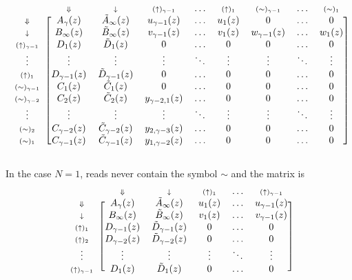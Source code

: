 \documentclass{article}
\newcommand{\DN}{\scriptstyle{\Downarrow}}
\newcommand{\dn}{\scriptstyle{\downarrow}}
\newcommand{\up}[1]{\scriptstyle{(\uparrow)_{#1}}}
\newcommand{\eq}[1]{\scriptstyle{(\sim)_{#1}}}
\begin{document}
\begin{equation*}
\begin{blockarray}{ccccccccc}
   & \DN & \dn &\up{\gamma-1} & \ldots & \up{1} &
    \eq{\gamma-1} & \ldots & \eq{1} \\
\begin{block}{c[cccccccc]}
\DN & A_\gamma(z) & \tilde{A}_\infty(z) & u_{\gamma-1}(z) & \ldots &
    u_1(z) & 0 & \ldots & 0 \\
\dn & B_\infty(z) & \tilde{B}_\infty(z) & v_{\gamma-1}(z) & \ldots &
    v_1(z) & w_{\gamma-1}(z) & \ldots & w_1(z) \\
\up{\gamma-1} & D_1(z) & \tilde{D}_1(z) & 0 & 
    \ldots & 0 & 0 & \ldots & 0 \\
\vdots & \vdots & \vdots & \vdots & \ddots & \vdots & \vdots &
    \ddots & \vdots \\
\up{1} & D_{\gamma-1}(z) & \tilde{D}_{\gamma-1}(z) & 0 & \ldots & 0 & 0 &
    \ldots & 0 \\
\eq{\gamma-1} & C_1(z) & \tilde{C}_1(z) & 0 & \ldots & 0 & 0 &
    \ldots & 0 \\
\eq{\gamma-2} & C_2(z) & \tilde{C}_2(z) & y_{\gamma-2,1}(z) &
    \ldots & 0 & 0 & \ldots & 0 \\
\vdots & \vdots & \vdots & \vdots & \ddots & \vdots & \vdots &
    \ddots & \vdots \\
\eq{2} & C_{\gamma-2}(z) & \tilde{C}_{\gamma-2}(z) &
    y_{2,\gamma-3}(z) & \ldots & 0 & 0 & \ldots & 0 \\
\eq{1} & C_{\gamma-1}(z) & \tilde{C}_{\gamma-1}(z) &
    y_{1,\gamma-2}(z) & \ldots & 0 & 0 & \ldots & 0 \\
\end{block}
\end{blockarray}
\end{equation*}

In the case $N = 1$, reads never contain the symbol $\sim$ and the matrix
is
\begin{equation*}
\begin{blockarray}{cccccc}
   & \DN & \dn & \up{1} & \ldots & \up{\gamma-1} \\
\begin{block}{c[ccccc]}
\DN & A_\gamma(z) & \tilde{A}_\infty(z) & u_1(z)
    & \ldots & u_{\gamma-1}(z) \\
\dn & B_\infty(z) & \tilde{B}_\infty(z) & v_1(z)
    & \ldots & v_{\gamma-1}(z) \\
\up{1} & D_{\gamma-1}(z) & \tilde{D}_{\gamma-1}(z) & 0 &
    \ldots & 0 \\
\up{2} & D_{\gamma-2}(z) & \tilde{D}_{\gamma-2}(z) & 0 &
    \ldots & 0  \\
\vdots & \vdots & \vdots & \vdots & \ddots & \vdots \\
\up{\gamma-1} & D_1(z) & \tilde{D}_1(z) & 0 & \ldots & 0 \\
\end{block}
\end{blockarray}
\end{equation*}
\end{document}
